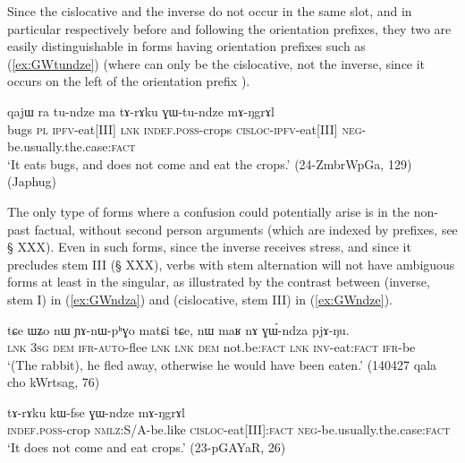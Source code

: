 Since the cislocative and the inverse do not occur in the same slot, and in particular respectively before and following the orientation prefixes, they two are easily distinguishable in forms having orientation prefixes such as (\ref{ex:GWtundze}) (where  can only be the cislocative, not the inverse, since it occurs on the left of the orientation prefix ).

\begin{exe}
\ex \label{ex:GWtundze}
 \gll qajɯ ra tu-ndze ma tɤ-rɤku ɣɯ-tu-ndze mɤ-ŋgrɤl \\
bugs \textsc{pl} \textsc{ipfv}-eat[III] \textsc{lnk} \textsc{indef}.\textsc{poss}-crops   \textsc{cisloc}-\textsc{ipfv}-eat[III] \textsc{neg}-be.usually.the.case:\textsc{fact} \\
\glt `It eats bugs, and does not come and eat the crops.' (24-ZmbrWpGa, 129) (Japhug)
\end{exe}

The only type of forms where a confusion could potentially arise is in the non-past factual, without second person arguments (which are indexed by prefixes, see § XXX). Even in such forms, since the inverse receives stress, and since it precludes stem III (§ XXX), verbs with stem alternation will not have ambiguous forms at least in the singular, as illustrated by the contrast between  (inverse, stem I) in (\ref{ex:GWndza}) and  (cislocative, stem III) in (\ref{ex:GWndze}). 

\begin{exe}
\ex \label{ex:GWndza}
 \gll  tɕe ɯʑo nɯ ɲɤ-nɯ-pʰɣo matɕi tɕe, nɯ maʁ nɤ ɣɯ́-ndza pjɤ-ŋu. \\
 \textsc{lnk} \textsc{3sg} \textsc{dem} \textsc{ifr}-\textsc{auto}-flee \textsc{lnk} \textsc{lnk} \textsc{dem} not.be:\textsc{fact} \textsc{lnk} \textsc{inv}-eat:\textsc{fact} \textsc{ifr}-be \\
\glt `(The rabbit), he fled away, otherwise he would have been eaten.' (140427 qala cho kWrtsag, 76)
\end{exe}

\begin{exe}
\ex \label{ex:GWndze}
 \gll  tɤ-rɤku kɯ-fse ɣɯ-ndze mɤ-ŋgrɤl \\
 \textsc{indef}.\textsc{poss}-crop \textsc{nmlz}:S/A-be.like \textsc{cisloc}-eat[III]:\textsc{fact} \textsc{neg}-be.usually.the.case:\textsc{fact} \\
 \glt `It does not come and eat crops.' (23-pGAYaR, 26)
\end{exe}


